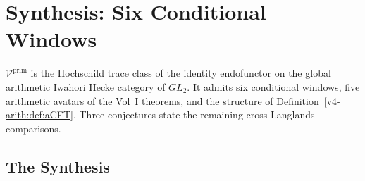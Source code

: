 \chapter{Synthesis: Six Conditional Windows}
\label{v4-arith:synthesis}

\(\mathcal{V}^{\mathrm{prim}}\) is the Hochschild trace class of
the identity endofunctor on the global arithmetic Iwahori Hecke
category of \(GL_{2}\). It admits six conditional windows, five
arithmetic avatars of the Vol~I theorems, and the structure
of Definition~\ref{v4-arith:def:aCFT}. Three conjectures state
the remaining cross-Langlands comparisons.

\section{The Synthesis}
\label{v4-arith:syn:synthesis}

